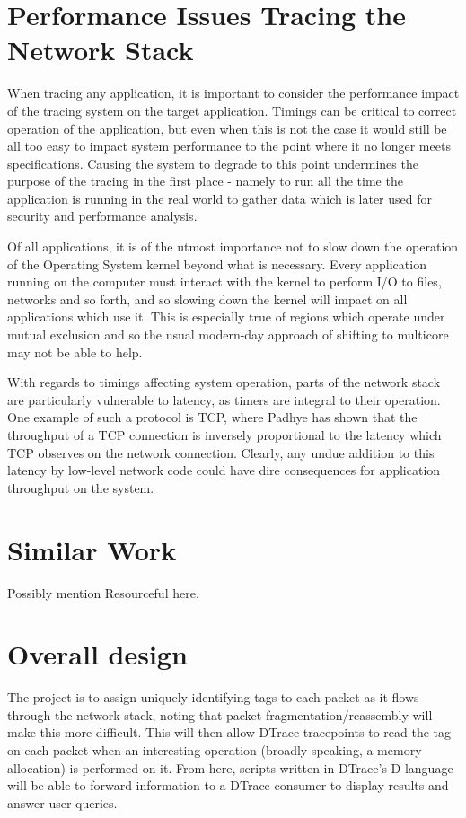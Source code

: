 \documentclass[a4paper,12pt,twoside,openright]{report}
\begin{document}
	\section{Performance Issues Tracing the Network Stack}
	
	When tracing any application, it is important to consider the performance impact of the tracing system on the target application. Timings can be critical to correct operation of the application, but even when this is not the case it would still be all too easy to impact system performance to the point where it no longer meets specifications. Causing the system to degrade to this point undermines the purpose of the tracing in the first place - namely to run all the time the application is running in the real world to gather data which is later used for security and performance analysis.
	
	Of all applications, it is of the utmost importance not to slow down the operation of the Operating System kernel beyond what is necessary. Every application running on the computer must interact with the kernel to perform I/O to files, networks and so forth, and so slowing down the kernel will impact on all applications which use it. This is especially true of regions which operate under mutual exclusion and so the usual modern-day approach of shifting to multicore may not be able to help.
	
	With regards to timings affecting system operation, parts of the network stack are particularly vulnerable to latency, as timers are integral to their operation. One example of such a protocol is TCP, where Padhye\cite{Padhye-TCP} has shown that the throughput of a TCP connection is inversely proportional to the latency which TCP observes on the network connection. Clearly, any undue addition to this latency by low-level network code could have dire consequences for application throughput on the system.
	
	\section{Similar Work}
	
	Possibly mention Resourceful here.
	
	\section{Overall design}
	
	The project is to assign uniquely identifying tags to each packet as it flows through the network stack, noting that packet fragmentation/reassembly will make this more difficult. This will then allow DTrace tracepoints to read the tag on each packet when an interesting operation (broadly speaking, a memory allocation) is performed on it. From here, scripts written in DTrace's D language will be able to forward information to a DTrace consumer to display results and answer user queries.
\end{document}
